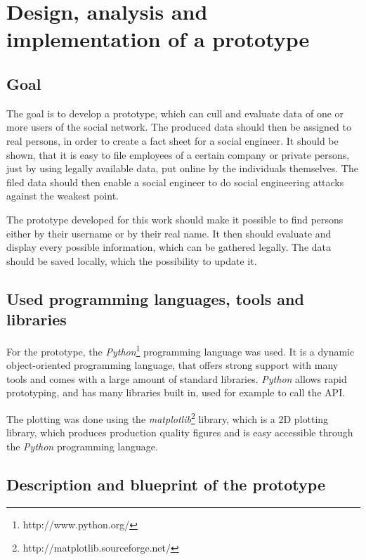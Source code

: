 \chapter{Design, analysis and implementation of a prototype}
\label{chapter:prototype}

\section{Goal}

The goal is to develop a prototype, which can cull and evaluate data of one or
more users of the \Twitter{} social network. The produced data should then be
assigned to real persons, in order to create a fact sheet for a social
engineer. It should be shown, that it is easy to file employees of a certain
company or private persons, just by using legally available data, put online by
the individuals themselves. The filed data should then enable a social
engineer to do social engineering attacks against the weakest point.

The prototype developed for this work should make it possible to find persons
either by their username or by their real name.
It then should evaluate and display every possible information, which can be
gathered legally. The data should be saved locally, which the possibility to
update it.

\section{Used programming languages, tools and libraries}

For the prototype, the \textit{Python}\footnote{http://www.python.org/} programming
language was used. It is a dynamic object-oriented programming language, that
offers strong support with many tools and comes with a large amount of standard
libraries. \textit{Python} allows rapid prototyping, and has many libraries built
in, used for example to call the \Twitter{} API.

The plotting was done using the
\textit{matplotlib}\footnote{http://matplotlib.sourceforge.net/} library, which
is a 2D plotting library, which produces production quality figures and is easy
accessible through the \textit{Python} programming language.

\section{Description and blueprint of the prototype}

